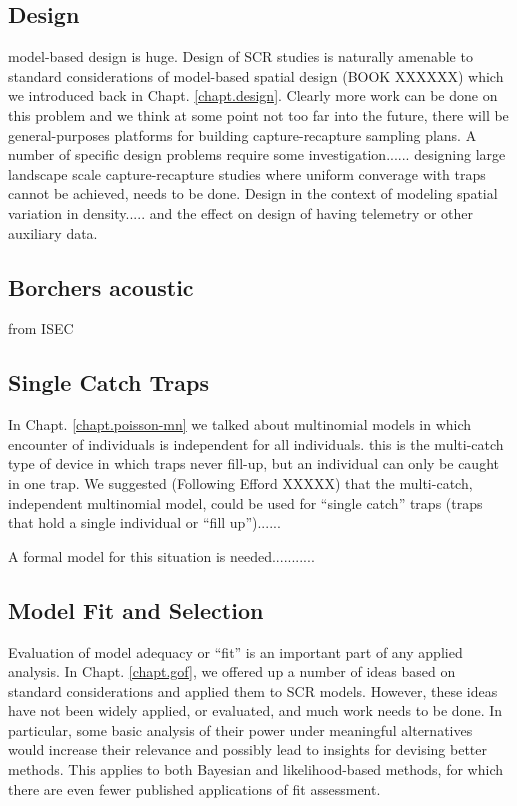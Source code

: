 \subsection{Design}

model-based design is huge. Design of SCR studies is naturally
amenable to standard considerations of model-based spatial design
(BOOK XXXXXX) which we introduced back in
Chapt. \ref{chapt.design}. Clearly more work can be done on this
problem and we think at some point not too far into the future, there
will be general-purposes platforms for building capture-recapture
sampling plans. 
A number of specific design problems require some
investigation...... designing large landscape scale capture-recapture
studies where uniform converage with traps cannot be achieved, needs
to be done.  
Design in the context of modeling spatial variation in
density..... and the effect on design of having telemetry or other
auxiliary data. 


\subsection{Borchers acoustic}

from ISEC

\subsection{Single Catch Traps}

In Chapt. \ref{chapt.poisson-mn} we talked about multinomial models in
which encounter of individuals is independent for all
individuals. this is 
the multi-catch type of device in which traps never fill-up, but an
individual can only be caught in one trap. 
We suggested (Following Efford XXXXX) that the multi-catch,
independent multinomial model, could be used for ``single catch''
traps (traps that hold a single individual or ``fill up'')......

A formal model for this situation is needed...........

\subsection{Model Fit and Selection}

Evaluation of model adequacy or ``fit'' is an important part of any
applied analysis. In Chapt. \ref{chapt.gof}, we offered up a number of
ideas based on standard considerations and applied them to SCR
models.  However, these ideas have not been widely applied, or evaluated, and much
work needs to be done. In particular, some basic analysis of their
power under meaningful alternatives would increase their relevance and
possibly lead to insights for devising better methods. This applies to
both Bayesian and likelihood-based methods, for which there are even
fewer published applications of fit assessment.


